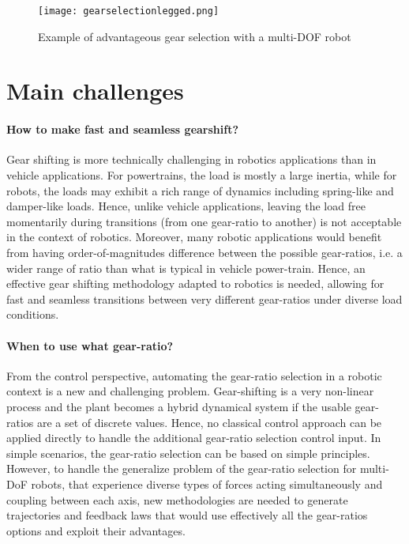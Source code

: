 \begin{figure}[H]
	\centering
		\texttt{[image: gearselectionlegged.png]}
	\caption{Example of advantageous gear selection with a multi-DOF robot}
	\label{fig:gearselectionlegged}
\end{figure}


\section{Main challenges}
\label{sec:MainChallenges}

\paragraph{How to make fast and seamless gearshift?}
Gear shifting is more technically challenging in robotics applications than in vehicle applications. For powertrains, the load is mostly a large inertia, while for robots, the loads may exhibit a rich range of dynamics including spring-like and damper-like loads. Hence, unlike vehicle applications, leaving the load free momentarily during transitions (from one gear-ratio to another) is not acceptable in the context of robotics. Moreover, many robotic applications would benefit from having order-of-magnitudes difference between the possible gear-ratios, i.e. a wider range of ratio than what is typical in vehicle power-train. Hence, an effective gear shifting methodology adapted to robotics is needed, allowing for fast and seamless transitions between very different gear-ratios under diverse load conditions.

\paragraph{When to use what gear-ratio?}
From the control perspective, automating the gear-ratio selection in a robotic context is a new and challenging problem. Gear-shifting is a very non-linear process and the plant becomes a hybrid dynamical system if the usable gear-ratios are a set of discrete values. Hence, no classical control approach can be applied directly to handle the additional gear-ratio selection control input. In simple scenarios, the gear-ratio selection can be based on simple principles. However, to handle the generalize problem of the gear-ratio selection for multi-DoF robots, that experience diverse types of forces acting simultaneously and coupling between each axis, new methodologies are needed to generate trajectories and feedback laws that would use effectively all the gear-ratios options and exploit their advantages.



